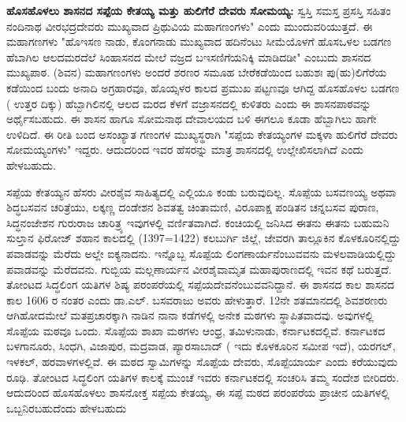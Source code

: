 \textbf{ಹೊಸಹೊಳಲು ಶಾಸನದ ಸಪ್ಪೆಯ ಕೇತಯ್ಯ ಮತ್ತು ಹುಲಿಗೆರೆ ದೇವರು ಸೋಮಯ್ಯ:} ಸ್ವಸ್ತಿ ಸಮಸ್ತ ಪ್ರಸಸ್ತಿ ಸಹಿತಂ ನಂದಿನಾಥ ವೀರಭದ್ರದೇವರು ಮುಖ್ಯವಾದ ಪ್ರಿಥುವಿಯ ಮಹಾಗಣಂಗಳು" ಎಂದು ಮುಂದುವರಿಯುತ್ತದೆ. ಈ ಮಹಾಗಣಗಳು "ಹೊಇಸಣ ನಾಡು, ಕೊಂಗನಾಡು ಮುಖ್ಯವಾದ ಹದಿನೆಂಟು ಸೀಮೆಯೊಳಗೆ ಹೊಸಒಳಲ ಬಡಗಣ ಹೆಬಾಗಿಲ ಆಲದಮರದೆಲೆ ಸಿಂಹಾಸನದ ಮೇಲೆ ವಜ್ರದ ಬಇಸಣಿಗೆಯನಿಕ್ಕಿ ಮಾಡಿದಡೀ" ಎಂಬುದು ಶಾಸನದ ಮುಖ್ಯಪಾಠ. (ಶಿವನ) ಮಹಾಗಣಂಗಳು ಅಂದರೆ ಶರಣರ ಸಮೂಹ ಬೇರೆಕಡೆಯಿಂದ ಬಹುಶಃ ಪು(ಹು)ಲಿಗೆರೆಯ ಕಡೆಯಿಂದ ಬಂದು ಅನಾದಿ ಅಗ್ರಹಾರವೂ, ಹೊಯ್ಸಳರ ಕಾಲದ ಪ್ರಮುಖ ಪಟ್ಟಣವೂ ಆಗಿದ್ದ ಹೊಸಹೊಳಲ ಬಡಗಣ ( ಉತ್ತರ ದಿಕ್ಕು) ಹೆಬ್ಬಾಗಿಲಿನಲ್ಲಿ ಆಲದ ಮರದ ಕೆಳಗೆ ವಜ್ರಾಸನದಲ್ಲಿ ಕುಳಿತರು ಎಂದು ಈ ಶಾಸನಪಾಠವನ್ನು ಅರ್ಥೈಸಬಹುದು. ಈ ಶಾಸನ ಹಾಗೂ ಸೋಮನಾಥ ದೇವಾಲಯದ ಬಳಿ ಈಗಲೂ ಕೂಡಾ ಹೆಬ್ಬಾಗಿಲು ಹಾಗೇ ಉಳಿದಿದೆ. ಈ ರೀತಿ ಬಂದ ಅಸಂಖ್ಯಾತ ಗಣಂಗಳ ಮುಖ್ಯಸ್ಥರಾಗಿ "ಸಪ್ಪೆಯ ಕೇತಯ್ಯಂಗಳ ಮಕ್ಕಳಾ ಹುಲಿಗೆರೆ ದೇವರು ಸೋಮಯ್ಯಂಗಳು" ಇದ್ದರು. ಆದುದರಿಂದ ಇವರ ಹೆಸರನ್ನು ಮಾತ್ರ ಶಾಸನದಲ್ಲಿ ಉಲ್ಲೇಖಿಸಲಾಗಿದೆ ಎಂದು ಹೇಳಬಹುದು.

ಸಪ್ಪೆಯ ಕೇತಯ್ಯನ ಹೆಸರು ವೀರಶೈವ ಸಾಹಿತ್ಯದಲ್ಲಿ ಎಲ್ಲಿಯೂ ಕಂಡು ಬರುವುದಿಲ್ಲ. ಸೊಪ್ಪೆಯ ಬಸವಣಯ್ಯ ಅಥವಾ ಶಿದ್ಧಬಸವನ ಚರಿತ್ರೆಯು, ಲಕ್ಕಣ್ಣ ದಂಡೇಶನ ಶಿವತತ್ವ ಚಿಂತಾಮಣಿ, ವಿರೂಪಾಕ್ಷ ಪಂಡಿತನ ಚನ್ನಬಸವ ಪುರಾಣ, ಸಿದ್ಧನಂಜೇಶನ ಗುರುರಾಜ ಚಾರಿತ್ರ್ಯ ಇವುಗಳಲ್ಲಿ ವರ್ಣಿತವಾಗಿದೆ. ಕಂಚಿಯಲ್ಲಿ ಜನಿಸಿದ ಈತನು ಈತನು ಬಹುಮನಿ ಸುಲ್ತಾನ ಫಿರೋಜ್​ ಶಹಾನ ಕಾಲದಲ್ಲಿ (1397=1422) ಕಲಬುರ್ಗಿ ಜಿಲ್ಲೆ, ಜೇವರಗಿ ತಾಲ್ಲೂಕಿನ ಕೊಳಕೂರಿನಲ್ಲಿದ್ದು ಪವಾಡವನ್ನು ಮೆರೆದು ಅಲ್ಲೇ ಐಕ್ಯನಾದನು. ಇನ್ನೊಬ್ಬ ಸೊಪ್ಪೆಯ ಲಿಂಗಣಾರ್ಯನೆಂಬುವವನು ಮಳಲವಾಡಿಯಲ್ಲಿದ್ದು ಪವಾಡವನ್ನು ಮೆರೆದವನು. ಗುಬ್ಬಿಯ ಮಲ್ಲಣಾರ್ಯನ ವೀರಶೈವಾಮೃತ ಮಹಾಪುರಾಣದಲ್ಲಿ ಇವನ ಕಥೆ ಬರುತ್ತದೆ. ತೋಂಟದ ಸಿದ್ಧಲಿಂಗ ಯತಿಗಳ ಶಿಷ್ಯ ಪರಂಪರೆಯಲ್ಲಿ ಸಪ್ಪೆಯದೇವನೆಂಬುವವನಿದ್ದಾನೆ. ಈ ಶಾಸನದ ಕಾಲ ಶಾಸನದ ಕಾಲ 1606 ರ ನಂತರ ಎಂದು ಡಾ.ಎಲ್​. ಬಸವರಾಜು ಅವರು ಹೇಳುತ್ತಾರೆ. 12ನೇ ಶತಮಾನದಲ್ಲಿ ಶಿವಶರಣರು ಆಗಿಹೋದಮೇಲೆ ಮತಪ್ರಚಾರಕ್ಕಾಗಿ ನಾಡಿನ ನಾನಾ ಕಡೆಗಳಲ್ಲಿ ಅನೇಕ ಮಠಗಳು ಸ್ಥಾಪಿತವಾದವು. ಅವುಗಳಲ್ಲಿ ಸೊಪ್ಪೆಯ ಮಠವೂ ಒಂದು. ಸೊಪ್ಪೆಯ ಶಾಖಾ ಮಠಗಳು ಆಂಧ್ರ, ತಮಿಳುನಾಡು, ಕರ್ನಾಟಕದಲ್ಲಿವೆ. ಕರ್ನಾಟಕದ ಬಳಗಾನೂರು, ಸಿಂಧಗಿ, ವಿಜಾಪುರ, ಮದ್ರವಾಡ, ಪ್ಯಾರಸಾಬಾದ್​ ( ಇದು ಕೊಳಕೂರಿನ ಸಮೀಪ ಇದೆ), ಯರಗಲ್​, ಇಳಕಲ್​, ಹರವಾಳಗಳಲ್ಲಿವೆ. ಈ ಮಠದ ಸ್ವಾಮಿಗಳನ್ನು ಸೊಪ್ಪೆಯ ದೇವರು, ಸೊಪ್ಪೆಯಾರ್ಯ ಎಂದು ಕರೆಯುವುದು ರೂಢಿ. ತೋಂಟದ ಸಿದ್ಧಲಿಂಗ ಯತಿಗಳ ಕಾಲಕ್ಕೆ ಮುಂಚೆ ಇವರು ಕರ್ನಾಟಕದಲ್ಲಿ ಸಂಚರಿಸಿ ತಮ್ಮ ಸಂದೇಶ ಬೀರಿದರು. ಆದುದರಿಂದ ಹೊಸಹೊಳಲು ಶಾಸನೋಕ್ತ ಸಪ್ಪೆಯ ಕೇತಯ್ಯ, ಈ ಸಪ್ಪೆ ಮಠದ ಪರಂಪರೆಯ ಪ್ರಾಚೀನ ಯತಿಗಳಲ್ಲಿ ಒಬ್ಬನಿರಬಹುದೆಂದು ಹೇಳಬಹುದು


